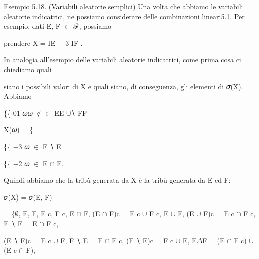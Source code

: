 \documentclass[a4paper,portrait,12pt]{article}
\begin{document}
\begin{flushleft}
Esempio 5.18. (Variabili aleatorie semplici) Una volta che abbiamo le variabili aleatorie indicatrici, ne possiamo considerare delle combinazioni lineari5.1. Per esempio, dati E, F $\in$ ℱ, possiamo
\end{flushleft}


\begin{flushleft}
prendere X = IE $-$ 3 IF .
\end{flushleft}


\begin{flushleft}
In analogia all'esempio delle variabili aleatorie indicatrici, come prima cosa ci chiediamo quali
\end{flushleft}


\begin{flushleft}
siano i possibili valori di X e quali siano, di conseguenza, gli elementi di 𝜎(X). Abbiamo
\end{flushleft}





\begin{flushleft}
\{\{ 01 𝜔𝜔 $\notin$$\in$ EE $\cup$∖ FF
\end{flushleft}


\begin{flushleft}
X(𝜔) = \{
\end{flushleft}


\begin{flushleft}
\{\{ $-$3 𝜔 $\in$ F ∖ E
\end{flushleft}


\begin{flushleft}
\{\{ $-$2 𝜔 $\in$ E $\cap$ F.
\end{flushleft}


\begin{flushleft}
Quindi abbiamo che la tribù generata da X \`{e} la tribù generata da E ed F:
\end{flushleft}


\begin{flushleft}
𝜎(X) = 𝜎(E, F)
\end{flushleft}


\begin{flushleft}
= \{$\emptyset$, E, F, E c, F c, E $\cap$ F, (E $\cap$ F)c = E c $\cup$ F c, E $\cup$ F, (E $\cup$ F)c = E c $\cap$ F c, E ∖ F = E $\cap$ F c,
\end{flushleft}


\begin{flushleft}
(E ∖ F)c = E c $\cup$ F, F ∖ E = F $\cap$ E c, (F ∖ E)c = F c $\cup$ E, E$\Delta$F = (E $\cap$ F c) $\cup$ (E c $\cap$ F),
\end{flushleft}
\end{document}
